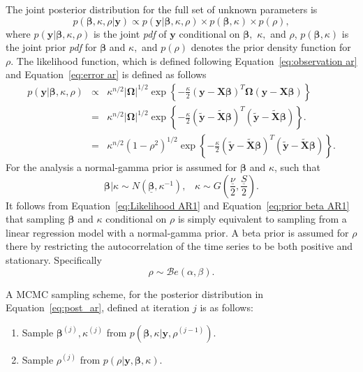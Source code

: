 \documentclass[article]{jss}
\begin{document}
The joint posterior distribution for the full set of unknown parameters
is
\begin{equation} p(\bm{\beta},\kappa,\rho|\bm{y})\propto
  p(\bm{y}|\bm{\beta},\kappa,\rho)\times p(\bm{\beta},\kappa)\times
  p(\rho),\label{eq:post_ar}
\end{equation} where
$p(\bm{y}|\bm{\beta},\kappa,\rho)$ is the joint \emph{pdf} of $\bm{y}$
conditional on $\bm{\beta},$ $\kappa,$ and $\rho$,
$p(\bm{\beta},\kappa)$ is the joint prior \emph{pdf} for $\bm{\beta}$
and $\kappa,$ and $p(\rho)$ denotes the prior density function for
$\rho.$ The likelihood function, which is defined following
Equation~\ref{eq:observation ar} and Equation~\ref{eq:error ar} is defined as
follows
\begin{eqnarray}
  p(\bm{y}|\bm{\beta},\kappa,\rho) & \propto & \kappa^{n/2}|\bm{\Omega}|^{1/2}\exp\left\{ -\frac{\kappa}{2}\left(\bm{y}-\bm{X}\bm{\beta}\right)^{T}\bm{\Omega}\left(\bm{y}-\bm{X}\bm{\beta}\right)\right\} \nonumber \\
  & = & \kappa^{n/2}|\bm{\Omega}|^{1/2}\exp\left\{ -\frac{\kappa}{2}\left(\tilde{\bm{y}}-\tilde{\bm{X}}\bm{\beta}\right)^{T}\left(\tilde{\bm{y}}-\tilde{\bm{X}}\bm{\beta}\right)\right\} .\nonumber \\
  & = & \kappa^{n/2}\left(1-\rho^{2}\right)^{1/2}\exp\left\{
    -\frac{\kappa}{2}\left(\tilde{\bm{y}}-\tilde{\bm{X}}\bm{\beta}\right)^{T}\left(\tilde{\bm{y}}-\tilde{\bm{X}}\bm{\beta}\right)\right\}
  .
  \label{eq:Likelihood AR1}
\end{eqnarray} 
For the analysis a normal-gamma prior is assumed for $\bm{\beta}$ and
$\kappa$, such that
\begin{equation} \bm{\beta}|\kappa\sim
  N\left(\underline{\bm{\beta}},\kappa^{-1}\right),\,\,\,\,\,\kappa\sim
  G\left(\frac{\underline{\nu}}{2},\frac{\underline{S}}{2}\right).
  \label{eq:prior
    beta AR1}
\end{equation} It follows from Equation~\ref{eq:Likelihood AR1}
and Equation~\ref{eq:prior beta AR1} that sampling $\bm{\beta}$ and $\kappa$
conditional on $\rho$ is simply equivalent to sampling from a linear
regression model with a normal-gamma prior. A beta prior is assumed
for $\rho$ there by restricting the autocorrelation of the time series
to be both positive and stationary. Specifically\[
\rho\sim\mathcal{B}e\left(\alpha,\beta\right).\]

A MCMC sampling scheme, for the posterior distribution in
Equation~\ref{eq:post_ar}, defined at iteration $j$ is as follows:
\begin{enumerate}
\item Sample $\bm{\beta}^{(j)},\kappa^{(j)}$ from
  $p(\bm{\beta},\kappa|\bm{y},\rho^{(j-1)}).$
\item Sample $\rho^{(j)}$ from $p(\rho|\bm{y},\bm{\beta},\kappa).$
\end{enumerate}
\end{document}
